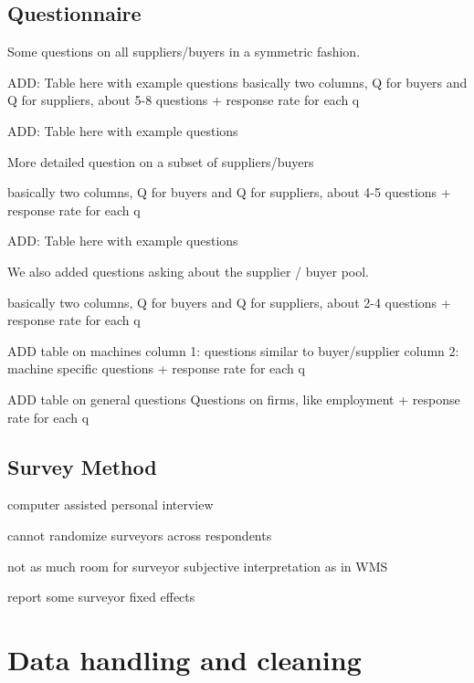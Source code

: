 \documentclass[final, dvipsnames, authoryear,12pt]{elsarticle}
\begin{document}
\subsection{Questionnaire}

Some questions on all suppliers/buyers in a symmetric fashion. 

ADD: Table here with example questions
basically two columns, Q for buyers and Q for suppliers, about 5-8 questions
+ response rate for each q

ADD: Table here with example questions

More detailed question on a subset of suppliers/buyers 

basically two columns, Q for buyers and Q for suppliers, about 4-5 questions
+ response rate for each q

ADD: Table here with example questions

We also added questions asking about the supplier / buyer pool. 

basically two columns, Q for buyers and Q for suppliers, about 2-4 questions
+ response rate for each q



ADD table on machines
column 1: questions similar to buyer/supplier
column 2: machine specific questions
+ response rate for each q


ADD table on general questions
Questions on firms, like employment
+ response rate for each q

\subsection{Survey Method}

computer assisted personal interview

cannot randomize surveyors across respondents

not as much room for surveyor subjective interpretation as in WMS

report some surveyor fixed effects

\section{Data handling and cleaning}
\end{document}
